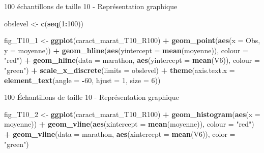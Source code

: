 \documentclass[ignorenonframetext,]{beamer}
\newenvironment{Shaded}{\begin{snugshade}}{\end{snugshade}}
\newcommand{\KeywordTok}[1]{\textcolor[rgb]{0.13,0.29,0.53}{\textbf{#1}}}
\newcommand{\DataTypeTok}[1]{\textcolor[rgb]{0.13,0.29,0.53}{#1}}
\newcommand{\DecValTok}[1]{\textcolor[rgb]{0.00,0.00,0.81}{#1}}
\newcommand{\StringTok}[1]{\textcolor[rgb]{0.31,0.60,0.02}{#1}}
\newcommand{\OperatorTok}[1]{\textcolor[rgb]{0.81,0.36,0.00}{\textbf{#1}}}
\newcommand{\NormalTok}[1]{#1}
\begin{document}
\begin{frame}[fragile]{100 échantillons de taille 10 - Représentation
graphique}

\begin{Shaded}
\begin{Highlighting}[]
\NormalTok{obslevel <-}\StringTok{ }\KeywordTok{c}\NormalTok{(}\KeywordTok{seq}\NormalTok{(}\DecValTok{1}\OperatorTok{:}\DecValTok{100}\NormalTok{))}

\NormalTok{fig_T10_}\DecValTok{1}\NormalTok{ <-}
\StringTok{  }\KeywordTok{ggplot}\NormalTok{(caract_marat_T10_R100) }\OperatorTok{+}
\StringTok{  }\KeywordTok{geom_point}\NormalTok{(}\KeywordTok{aes}\NormalTok{(}\DataTypeTok{x =}\NormalTok{ Obs, }\DataTypeTok{y =}\NormalTok{ moyenne)) }\OperatorTok{+}
\StringTok{  }\KeywordTok{geom_hline}\NormalTok{(}\KeywordTok{aes}\NormalTok{(}\DataTypeTok{yintercept =} \KeywordTok{mean}\NormalTok{(moyenne)), }\DataTypeTok{colour =} \StringTok{"red"}\NormalTok{) }\OperatorTok{+}
\StringTok{  }\KeywordTok{geom_hline}\NormalTok{(}\DataTypeTok{data =}\NormalTok{ marathon, }\KeywordTok{aes}\NormalTok{(}\DataTypeTok{yintercept =} \KeywordTok{mean}\NormalTok{(V6)), }\DataTypeTok{colour =} \StringTok{"green"}\NormalTok{) }\OperatorTok{+}
\StringTok{  }\KeywordTok{scale_x_discrete}\NormalTok{(}\DataTypeTok{limits =}\NormalTok{ obslevel) }\OperatorTok{+}
\StringTok{  }\KeywordTok{theme}\NormalTok{(}\DataTypeTok{axis.text.x =} \KeywordTok{element_text}\NormalTok{(}\DataTypeTok{angle =} \OperatorTok{-}\DecValTok{60}\NormalTok{, }\DataTypeTok{hjust =} \DecValTok{1}\NormalTok{, }\DataTypeTok{size =} \DecValTok{6}\NormalTok{))}
\end{Highlighting}
\end{Shaded}

\end{frame}

\begin{frame}[fragile]{100 Échantillons de taille 10 - Représentation
graphique}

\begin{Shaded}
\begin{Highlighting}[]
\NormalTok{fig_T10_}\DecValTok{2}\NormalTok{ <-}\StringTok{ }
\StringTok{  }\KeywordTok{ggplot}\NormalTok{(caract_marat_T10_R100) }\OperatorTok{+}
\StringTok{  }\KeywordTok{geom_histogram}\NormalTok{(}\KeywordTok{aes}\NormalTok{(}\DataTypeTok{x =}\NormalTok{ moyenne)) }\OperatorTok{+}
\StringTok{  }\KeywordTok{geom_vline}\NormalTok{(}\KeywordTok{aes}\NormalTok{(}\DataTypeTok{xintercept =} \KeywordTok{mean}\NormalTok{(moyenne)), }\DataTypeTok{colour =} \StringTok{"red"}\NormalTok{) }\OperatorTok{+}
\StringTok{  }\KeywordTok{geom_vline}\NormalTok{(}\DataTypeTok{data =}\NormalTok{ marathon, }\KeywordTok{aes}\NormalTok{(}\DataTypeTok{xintercept =} \KeywordTok{mean}\NormalTok{(V6)), }\DataTypeTok{color =} \StringTok{"green"}\NormalTok{)}
\end{Highlighting}
\end{Shaded}

\end{frame}
\end{document}
